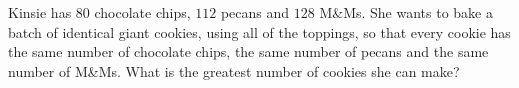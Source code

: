 Kinsie has $80$ chocolate chips, $112$ pecans and $128$ M\&Ms. She wants to bake a batch of identical giant cookies, using all of the toppings, so that every cookie has the same number of chocolate chips, the same number of pecans and the same number of M\&Ms. What is the greatest number of cookies she can make?
